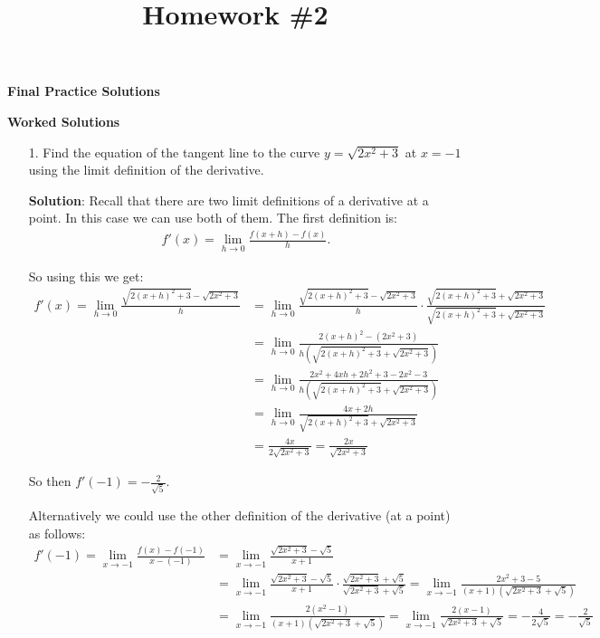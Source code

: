 \documentclass[11pt,reqno]{article}
\title{Homework \#2}
\theoremstyle{definition}
\begin{document}
	\centerline{\textbf{\Large{Final Practice Solutions}}}
	
	
	\textbf{\Large{Worked Solutions}}
	
	\begin{enumerate}
		\item[1.] Find the equation of the tangent line to the curve $y = \sqrt{2x^2 + 3}$ at $x = -1$ using the limit definition of the derivative. 
		
		\textbf{Solution}: Recall that there are two limit definitions of a derivative at a point. In this case we can use both of them. The first definition is: 
		\begin{align*}
			f'(x) = \lim\limits_{h \to 0} \frac{f(x + h) - f(x)}{h}.
		\end{align*}
		
		So using this we get: 
		\begin{align*}
			f'(x) = \lim\limits_{h \to 0} \frac{\sqrt{2 (x + h)^2 + 3} - \sqrt{2x^2 + 3}}{h} &= \lim\limits_{h \to 0} \frac{\sqrt{2 (x + h)^2 + 3} - \sqrt{2x^2 + 3}}{h} \cdot \frac{\sqrt{2 (x + h)^2 + 3} + \sqrt{2x^2 + 3}}{\sqrt{2 (x + h)^2 + 3} + \sqrt{2x^2 + 3}} \\
			&= \lim\limits_{h \to 0} \frac{2(x+h)^2 - (2x^2 + 3)}{ h (\sqrt{2 (x + h)^2 + 3} + \sqrt{2x^2 + 3})} \\
			&= \lim\limits_{h \to 0} \frac{2x^2 + 4xh + 2h^2 +3 - 2x^2 - 3}{h (\sqrt{2 (x + h)^2 + 3} + \sqrt{2x^2 + 3})} \\
			&= \lim\limits_{h \to 0} \frac{4x + 2h}{\sqrt{2 (x + h)^2 + 3} + \sqrt{2x^2 + 3}} \\
			&= \frac{4x}{2 \sqrt{2x^2 + 3}} = \frac{2x}{\sqrt{2x^2 + 3}}
		\end{align*}
		
		So then $f'(-1) = -\frac{2}{\sqrt{5}}$.
		
		Alternatively we could use the other definition of the derivative (at a point) as follows:
		\begin{align*}
			f'(-1) = \lim\limits_{x \to -1} \frac{f(x) - f(-1)}{x - (-1)} &= \lim\limits_{x \to -1} \frac{\sqrt{2x^2 + 3} - \sqrt{5}}{x + 1} \\
			&= \lim\limits_{x \to -1} \frac{\sqrt{2x^2 + 3} - \sqrt{5}}{x + 1} \cdot \frac{\sqrt{2 x^2 + 3} + \sqrt{5}}{\sqrt{2x^2 + 3} + \sqrt{5}} = \lim\limits_{x \to -1}\frac{2x^2 + 3 - 5}{(x + 1)(\sqrt{2x^2 + 3} + \sqrt{5})} \\
			&= \lim\limits_{x \to -1} \frac{2(x^2 - 1)}{(x + 1)(\sqrt{2x^2 + 3} + \sqrt{5})} = \lim\limits_{x \to -1} \frac{2(x - 1)}{\sqrt{2x^2 + 3} + \sqrt{5}} = - \frac{4}{2\sqrt{5}} = - \frac{2}{\sqrt{5}}
		\end{align*}
		

\end{enumerate}
\end{document}
